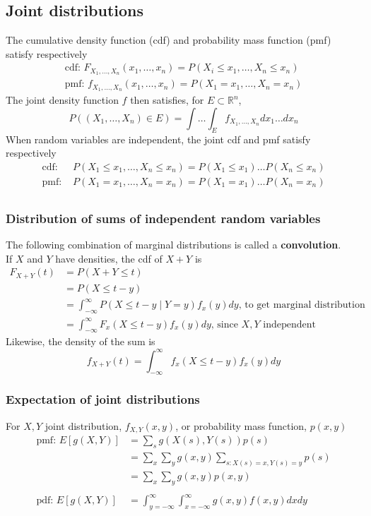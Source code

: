 \documentclass{article}
\begin{document}
\subsection{Joint distributions}
The cumulative density function (cdf) and probability mass function (pmf) satisfy respectively
\begin{align*}
    \textrm{cdf: } F_{X_1,\dots,X_n}(x_1, \dots, x_n) = P(X_i \leq x_1, \dots, X_n \leq x_n)\\
    \textrm{pmf: } f_{X_1,\dots,X_n}(x_1, \dots, x_n) = P(X_1=x_1, \dots, X_n = x_n)
\end{align*}
The joint density function $f$ then satisfies, for $E \subset \mathbb{R}^n$,
\begin{equation*}
    P((X_1, \dots, X_n)\in E) = \int \dots \int_E f_{X_1,\dots,X_n}dx_1\dots dx_n
\end{equation*}
When random variables are independent, the joint cdf and pmf satisfy respectively
\begin{align*}
    \textrm{cdf: } & P(X_1\leq x_1, \dots, X_n \leq x_n) = P(X_1\leq x_1)\dots P(X_n\leq x_n)\\
    \textrm{pmf: } & P(X_1= x_1, \dots, X_n = x_n) = P(X_1=x_1)\dots P(X_n=x_n)\\
\end{align*}

\subsubsection{Distribution of sums of independent random variables}
The following combination of marginal distributions is called a \textbf{convolution}.\\
If $X$ and $Y$ have densities, the cdf of $X+Y$ is
\begin{align*}
    F_{X+Y}(t) &= P(X+Y\leq t)\\
    &= P(X \leq t-y)\\
    &= \int_{-\infty}^\infty P(X \leq t-y \mid Y=y) f_x(y)dy \textrm{, to get marginal distribution}\\
    &= \int_{-\infty}^\infty F_x(X \leq t-y) f_x(y)dy \textrm{, since $X,Y$ independent}
\end{align*}
Likewise, the density of the sum is
\begin{equation*}
    f_{X+Y}(t) = \int_{-\infty}^\infty f_x(X \leq t-y) f_x(y)dy
\end{equation*}

\subsubsection{Expectation of joint distributions}
For $X,Y$ joint distribution, $f_{X,Y}(x,y)$, or probability mass function, $p(x,y)$
\begin{align*}
    \textrm{pmf: } E[g(X,Y)] &= \sum_s g(X(s), Y(s))p(s)\\
    &= \sum_x\sum_y g(x,y) \sum_{s:X(s)=x,Y(s)=y}p(s)\\
    &= \sum_x\sum_y g(x,y)p(x,y)\\ \\
    \textrm{pdf: } E[g(X,Y)] &= \int_{y= -\infty}^{\infty} \int_{x= -\infty}^{\infty} g(x,y)f(x,y)dxdy
\end{align*}
\end{document}

